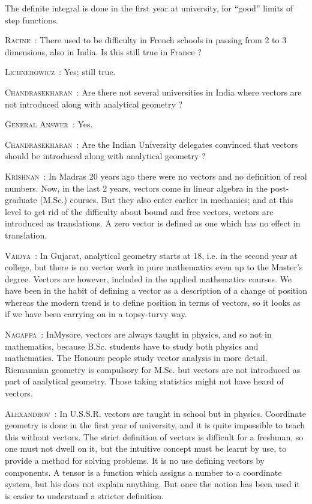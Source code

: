 The definite integral is done in the first year at university, for ``good'' limits of step functions.

\smallskip
\noindent
\textsc{Racine}~: There used to be difficulty in French schools in passing from 2 to 3 dimensions, also in India. Is this still true in France ?

\smallskip
\noindent
\textsc{Lichnerowicz}~: Yes; still true.

\smallskip
\noindent
\textsc{Chandrasekharan}~: Are there not several universities in India where vectors are not introduced along with analytical geometry ?

\smallskip
\noindent
\textsc{General Answer}~: Yes.

\smallskip
\noindent
\textsc{Chandrasekharan}~: Are the Indian University delegates convinced that vectors should be introduced along with analytical geometry ?

\smallskip
\noindent
\textsc{Krishnan}~: In Madras 20 years ago there were no vectors and no definition of real numbers. Now, in the last 2 years, vectors come in linear algebra in the post-graduate (M.Sc.) courses. But they also enter earlier in mechanics; and at this level to get rid of the difficulty about bound and free vectors, vectors are introduced as translations. A zero vector is defined as one which has no effect in translation.

\smallskip
\noindent
\textsc{Vaidya}~: In Gujarat, analytical geometry starts at 18, i.e. in the second year at college, but there is no vector work in pure mathematics even up to the Master's degree. Vectors are however, included in the applied mathematics courses. We have been in the habit of defining a vector as a description of a change of position whereas the modern trend is to define position in terms of vectors, so it looks as if we have been carrying on in a topsy-turvy way.

\smallskip
\noindent
\textsc{Nagappa}~: In\pageoriginale Mysore, vectors are always taught in physics, and so not in mathematics, because B.Sc. students have to study both physics and mathematics. The Honours people study vector analysis in more detail. Riemannian geometry is compulsory for M.Sc. but vectors are not introduced as part of analytical geometry. Those taking statistics might not have heard of vectors.

\smallskip
\noindent
\textsc{Alexandrov}~: In U.S.S.R. vectors are taught in school but in physics. Coordinate geometry is done in the first year of university, and it is quite impossible to teach this without vectors. The strict definition of vectors is difficult for a freshman, so one must not dwell on it, but the intuitive concept must be learnt by use, to provide a method for solving problems. It is no use defining vectors by components. A tensor is a function which assigns a number to a coordinate system, but his does not explain anything. But once the notion has been used it is easier to understand a stricter definition.


